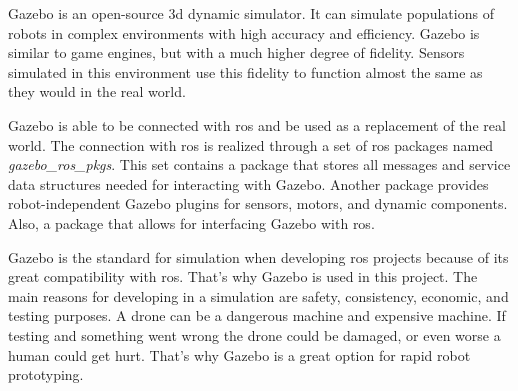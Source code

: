 Gazebo is an open-source \acs{3d} dynamic simulator. It can simulate populations of robots in complex environments with high accuracy and efficiency. Gazebo is similar to game engines, but with a much higher degree of fidelity. Sensors simulated in this environment use this fidelity to function almost the same as they would in the real world. \cite{gazebo_beginner_overview} \cite{ackerman2016gazebo}

Gazebo is able to be connected with \acs{ros} and be used as a replacement of the real world. The connection with \acs{ros} is realized through a set of \acs{ros} packages named \textit{gazebo\_ros\_pkgs}.
This set contains a package that stores all messages and service data structures needed for interacting with Gazebo. Another package provides robot\hyp{}independent Gazebo plugins for sensors, motors, and dynamic components. Also, a package that allows for interfacing Gazebo with \acs{ros}. \cite{gazebo_ros_overview} \cite{gazebo_ros_control}

Gazebo is the standard for simulation when developing \acs{ros} projects because of its great compatibility with \acs{ros}. That's why Gazebo is used in this project. The main reasons for developing in a simulation are safety, consistency, economic, and testing purposes. A drone can be a dangerous machine and expensive machine. If testing and something went wrong the drone could be damaged, or even worse a human could get hurt. That's why Gazebo is a great option for rapid robot prototyping.

